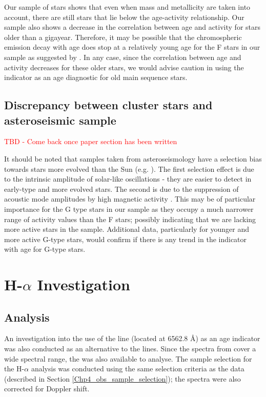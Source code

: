 Our sample of stars shows that even when mass and metallicity are taken into account, there are still stars that lie below the age-activity relationship. Our sample also shows a decrease in the correlation between age and activity for stars older than a gigayear. Therefore, it may be possible that the chromospheric emission decay with age does stop at a relatively young age for the F stars in our sample as suggested by \citet{Pace_2013}. In any case, since the correlation between age and activity decreases for these older stars, we would advise caution in using the \Rprime indicator as an age diagnostic for old main sequence stars.

\subsection{Discrepancy between cluster stars and asteroseismic sample}
\label{Chp4_discus_discrepancy}
\textcolor{red}{TBD - Come back once paper section has been written}

It should be noted that samples taken from asteroseismology have a selection bias towards stars more evolved than the Sun (e.g. \citealt{Metcalfe_etal_2016}). The first selection effect is due to the intrinsic amplitude of solar-like oscillations \citep{Houdek_etal_1999} - they are easier to detect in early-type and more evolved stars. The second is due to the suppression of acoustic mode amplitudes by high magnetic activity \citep{Chaplin_etal_2011_stellar_activity}. This may be of particular importance for the G type stars in our sample as they occupy a much narrower range of activity values than the F stars; possibly indicating that we are lacking more active stars in the sample. Additional data, particularly for younger and more active G-type stars, would confirm if there is any trend in the \Rprime indicator with age for G-type stars.

\section{\texorpdfstring{H-$\alpha$}{H-alpha} Investigation}
\label{Chp4_halpha}
\subsection{Analysis}
An investigation into the use of the \Halpha line (located at 6562.8 \AA) as an age indicator was also conducted as an alternative to the \caII lines. Since the spectra from \citet{Bruntt_etal_2012} cover a wide spectral range, the \Halpha was also available to analyse. The sample selection for the H-$\alpha$ analysis was conducted using the same selection criteria as the \caII data (described in Section \ref{Chp4_obs_sample_selection}); the spectra were also corrected for Doppler shift.

